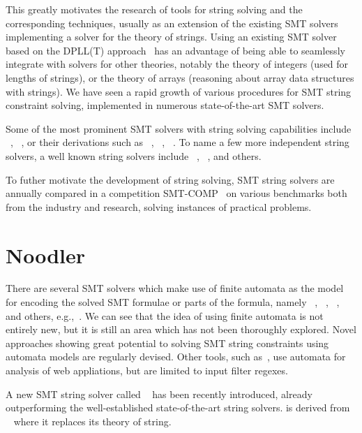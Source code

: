 This greatly motivates the research of tools for string solving and the corresponding techniques, usually as an extension of the existing SMT solvers implementing a solver for the theory of strings.
Using an existing SMT solver based on the DPLL(T) approach~\cite{dpll06} has an advantage of being able to seamlessly integrate with solvers for other theories, notably the theory of integers (used for lengths of strings), or the theory of arrays (reasoning about array data structures with strings).
We have seen a rapid growth of various procedures for SMT string constraint solving, implemented in numerous state-of-the-art SMT solvers.

Some of the most prominent SMT solvers
with string solving capabilities include \cvcv~\cite{cvc5}, \ziii~\cite{z3}, or their derivations such as \trau~\cite{Trau}, \ziiistriiire~\cite{Z3str3RE, BerzishDGKMMN23}, \ziiistriv~\cite{Z3str4}.
To name a few more independent string solvers, a well known string solvers include \ostrich~\cite{AnthonyComplex2019}, \norn~\cite{Norn}, and others.

To futher motivate the development of string solving, SMT string solvers are annually compared in a competition SMT-COMP~\cite{smt_comp} on various benchmarks both from the industry and research, solving instances of practical problems.

\section{Noodler}
There are several SMT solvers which make use of finite automata as the model for encoding the solved SMT formulae or parts of the formula, namely \ziiistriiire~\cite{Z3str3RE}, \trau~\cite{Trau}, \norn~\cite{Norn}, and others, e.g.,~\cite{AnthonyComplex2019}.
We can see that the idea of using finite automata is not entirely new, but it is still an area which has not been thoroughly explored.
Novel approaches showing great potential to solving SMT string constraints using automata models are regularly devised.
Other tools, such as~\cite{black_ostrich}, use automata for analysis of web appliations, but are limited to input filter regexes.

A new SMT string solver called \noodler~\cite{fm23_equations_synergy_regular_constraints_DBLP:conf/fm/BlahoudekCCHHLS23, oopsla23_stabilization_DBLP:journals/pacmpl/ChenCHHLS23,tacas24_noodler_10.1007/978-3-031-57246-3_2} has been recently introduced, already outperforming the well-established state-of-the-art string solvers.
\noodler is derived from \ziii~\cite{z3} where it replaces its theory of string.

